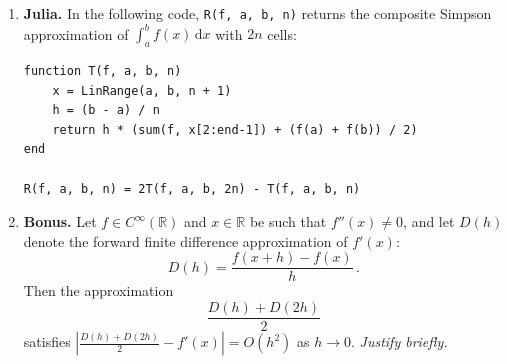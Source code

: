 \documentclass[a4paper]{article}
\renewcommand{\d}{\mathrm d}
\begin{document}
\begin{enumerate}
    \item
        \textbf{Julia.}
        In the following code, \texttt{R(f, a, b, n)} returns the composite Simpson approximation of $\int_a^b f(x) \, \d x$ with $2n$ cells:
        \begin{verbatim}
function T(f, a, b, n)
    x = LinRange(a, b, n + 1)
    h = (b - a) / n
    return h * (sum(f, x[2:end-1]) + (f(a) + f(b)) / 2)
end

R(f, a, b, n) = 2T(f, a, b, 2n) - T(f, a, b, n)
        \end{verbatim}

    \item \textbf{Bonus.}
        Let $f \in C^{\infty}(\mathbb R)$ and $x \in \mathbb R$ be such that $f''(x) \neq 0$,
        and let $D(h)$ denote the forward finite difference approximation of $f'(x)$:
        \[
            D(h) = \frac{f(x + h) - f(x)}{h}\,.
        \]
        Then the approximation
        \[
            \frac{D(h) + D(2h)}{2}
        \]
        satisfies $\left\lvert \frac{D(h) + D(2h)}{2} - f'(x) \right\rvert = O(h^2)$ as $h \to 0$.
        \emph{Justify briefly.}
\end{enumerate}

\ifdefined\showsolutions
\newpage
{}
\end{document}
